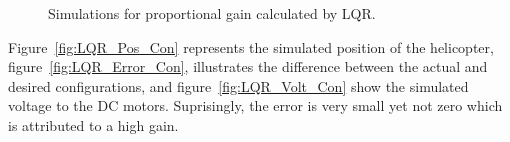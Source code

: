 \begin{figure}[!htbp]
    \centering
    \caption{Simulations for proportional gain calculated by LQR.}
\end{figure}
Figure~\ref{fig:LQR_Pos_Con} represents the simulated position of the helicopter, figure~\ref{fig:LQR_Error_Con}, illustrates the difference between the actual and desired configurations, and figure~\ref{fig:LQR_Volt_Con} show the simulated voltage to the DC motors.  Suprisingly, the error is very small yet not zero which is attributed to a high gain.

